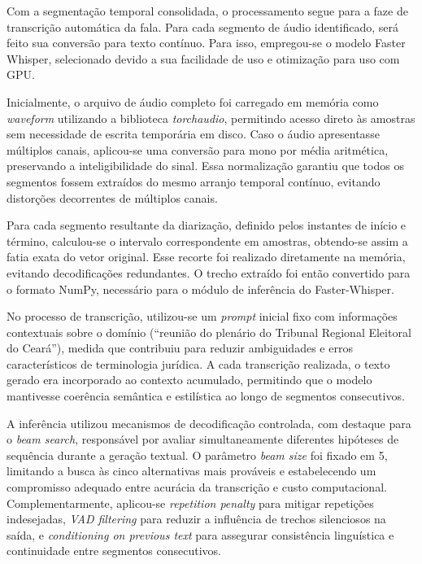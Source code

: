 Com a segmentação temporal consolidada, o processamento segue para a faze de transcrição automática da fala. Para cada segmento de áudio identificado, será feito sua conversão para texto contínuo. Para isso, empregou-se o modelo Faster Whisper, selecionado devido a sua facilidade de uso e otimização  para uso com GPU.

Inicialmente, o arquivo de áudio completo foi carregado em memória como \textit{waveform} utilizando a biblioteca \textit{torchaudio}, permitindo acesso direto às amostras sem necessidade de escrita temporária em disco. Caso o áudio apresentasse múltiplos canais, aplicou-se uma conversão para mono por média aritmética, preservando a inteligibilidade do sinal. Essa normalização garantiu que todos os segmentos fossem extraídos do mesmo arranjo temporal contínuo, evitando distorções decorrentes de múltiplos canais.

Para cada segmento resultante da diarização, definido pelos instantes de início e término, calculou-se o intervalo correspondente em amostras, obtendo-se assim a fatia exata do vetor original. Esse recorte foi realizado diretamente na memória, evitando decodificações redundantes. O trecho extraído foi então convertido para o formato NumPy, necessário para o módulo de inferência do Faster-Whisper.

No processo de transcrição, utilizou-se um \textit{prompt} inicial fixo com informações contextuais sobre o domínio (“reunião do plenário do Tribunal Regional Eleitoral do Ceará”), medida que contribuiu para reduzir ambiguidades e erros característicos de terminologia jurídica. A cada transcrição realizada, o texto gerado era incorporado ao contexto acumulado, permitindo que o modelo mantivesse coerência semântica e estilística ao longo de segmentos consecutivos.

A inferência utilizou mecanismos de decodificação controlada, com destaque para o \textit{beam search}, responsável por avaliar simultaneamente diferentes hipóteses de sequência durante a geração textual. O parâmetro \textit{beam size} foi fixado em 5, limitando a busca às cinco alternativas mais prováveis e estabelecendo um compromisso adequado entre acurácia da transcrição e custo computacional. Complementarmente, aplicou-se \textit{repetition penalty} para mitigar repetições indesejadas, \textit{VAD filtering} para reduzir a influência de trechos silenciosos na saída, e \textit{conditioning on previous text} para assegurar consistência linguística e continuidade entre segmentos consecutivos.

